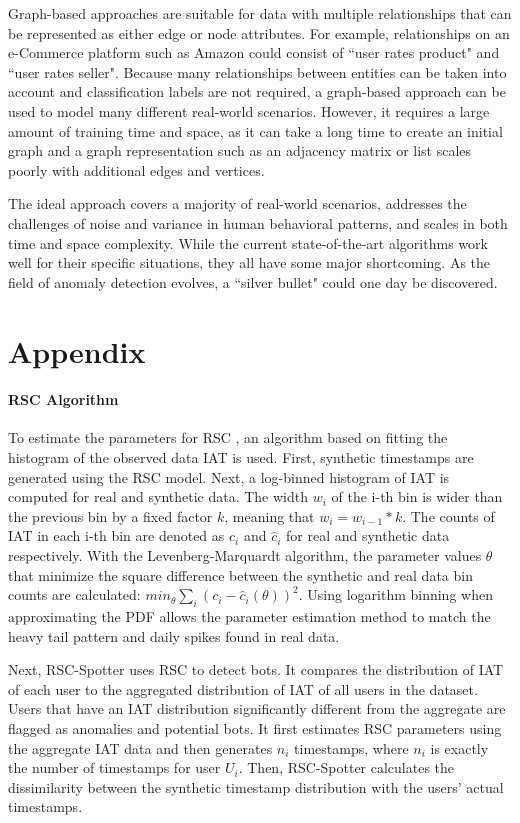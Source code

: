 \documentclass[11pt, oneside]{article}   	%
\begin{document}
\quad Graph-based approaches are suitable for data with multiple relationships that can be represented as either edge or node attributes.
For example, relationships on an e-Commerce platform such as Amazon could consist of ``user rates product" and ``user rates seller".
Because many relationships between entities can be taken into account and classification labels are not required, a graph-based approach can be used to model many different real-world scenarios.
However, it requires a large amount of training time and space, as it can take a long time to create an initial graph and a graph representation such as an adjacency matrix or list scales poorly with additional edges and vertices.

\quad The ideal approach covers a majority of real-world scenarios, addresses the challenges of noise and variance in human behavioral patterns, and scales in both time and space complexity.
While the current state-of-the-art algorithms work well for their specific situations, they all have some major shortcoming.
As the field of anomaly detection evolves, a ``silver bullet" could one day be discovered.

\section{Appendix}
\paragraph*{RSC Algorithm}
\quad

\quad To estimate the parameters for RSC \cite{rsc}, an algorithm based on fitting the histogram of the observed data IAT is used.
First, synthetic timestamps are generated using the RSC model.
Next, a log-binned histogram of IAT is computed for real and synthetic data.
The width $w_i$ of the i-th bin is wider than the previous bin by a fixed factor $k$, meaning that $w_i=w_{i-1}*k$.
The counts of IAT in each i-th bin are denoted as $c_i$ and $\hat{c}_i$ for real and synthetic data respectively.
With the Levenberg-Marquardt algorithm, the parameter values $\theta$ that minimize the square difference between the synthetic and real data bin counts are calculated: $min_{\theta} \sum_i (c_i - \hat{c}_i(\theta))^2$.
Using logarithm binning when approximating the PDF allows the parameter estimation method to match the heavy tail pattern and daily spikes found in real data.

\quad Next, RSC-Spotter uses RSC to detect bots.
It compares the distribution of IAT of each user to the aggregated distribution of IAT of all users in the dataset.
Users that have an IAT distribution significantly different from the aggregate are flagged as anomalies and potential bots.
It first estimates RSC parameters using the aggregate IAT data and then generates $n_i$ timestamps, where $n_i$ is exactly the number of timestamps for user $U_i$.
Then, RSC-Spotter calculates the dissimilarity between the synthetic timestamp distribution with the users' actual timestamps.
\end{document}
